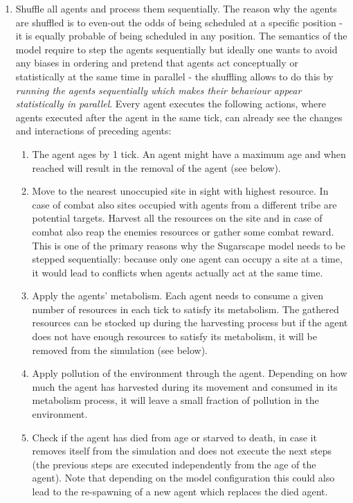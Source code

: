 \begin{enumerate}
	\item Shuffle all agents and process them sequentially. The reason why the agents are shuffled is to even-out the odds of being scheduled at a specific position - it is equally probable of being scheduled in any position. The semantics of the model require to step the agents sequentially but ideally one wants to avoid any biases in ordering and pretend that agents act conceptually or statistically at the same time in parallel - the shuffling allows to do this by \textit{running the agents sequentially which makes their behaviour appear statistically in parallel}. Every agent executes the following actions, where agents executed after the agent in the same tick, can already see the changes and interactions of preceding agents:
	
	\begin{enumerate}
		\item The agent ages by 1 tick. An agent might have a maximum age and when reached will result in the removal of the agent (see below).
	
		\item Move to the nearest unoccupied site in sight with highest resource. In case of combat also sites occupied with agents from a different tribe are potential targets. Harvest all the resources on the site and in case of combat also reap the enemies resources or gather some combat reward. This is one of the primary reasons why the Sugarscape model needs to be stepped sequentially: because only one agent can occupy a site at a time, it would lead to conflicts when agents actually act at the same time.

		\item Apply the agents' metabolism. Each agent needs to consume a given number of resources in each tick to satisfy its metabolism. The gathered resources can be stocked up during the harvesting process but if the agent does not have enough resources to satisfy its metabolism, it will be removed from the simulation (see below).
		
		\item Apply pollution of the environment through the agent. Depending on how much the agent has harvested during its movement and consumed in its metabolism process, it will leave a small fraction of pollution in the environment.
		
		\item Check if the agent has died from age or starved to death, in case it removes itself from the simulation and does not execute the next steps (the previous steps are executed independently from the age of the agent). Note that depending on the model configuration this could also lead to the re-spawning of a new agent which replaces the died agent.
		

\end{enumerate}
\end{enumerate}
